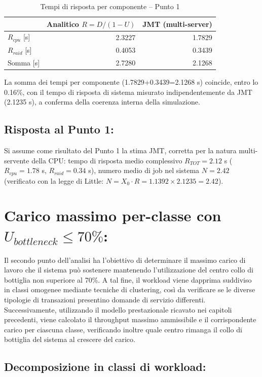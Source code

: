 \documentclass[11pt,a4paper]{article}
\begin{document}
\begin{table}[h]
\centering
\caption{Tempi di risposta per componente -- Punto 1}
\label{tab:punto1-percomp}
\begin{tabular}{lrr}
\toprule
 & Analitico $R=D/(1-U)$ & JMT (multi-server) \\
\midrule
$R_{cpu}$ [s] & 2.3227 & 1.7829 \\
$R_{raid}$ [s] & 0.4053 & 0.3439 \\
Somma [s] & 2.7280 & 2.1268 \\
\bottomrule
\end{tabular}
\end{table}

La somma dei tempi per componente (1.7829+0.3439=2.1268 s) coincide, entro lo 0.16\%, con il
tempo di risposta di sistema misurato indipendentemente da JMT (2.1235 s), a conferma della
coerenza interna della simulazione.

\subsection{Risposta al Punto 1:}
\label{sec:risposta-punto1}
Si assume come risultato del Punto 1 la stima JMT, corretta per la natura multi-servente della
CPU: tempo di risposta medio complessivo $R_{TOT}=2.12$ s ($R_{cpu}=1.78$ s, $R_{raid}=0.34$ s),
numero medio di job nel sistema $N=2.42$ (verificato con la legge di Little:
$N=X_0\cdot R = 1.1392\times 2.1235 = 2.42$).

\section{Carico massimo per-classe con $U_{bottleneck}\le 70\%$:}
Il secondo punto dell'analisi ha l'obiettivo di determinare il massimo carico di lavoro che il sistema può sostenere mantenendo l'utilizzazione del centro collo di bottiglia non superiore al 70\%. A tal fine, il workload viene dapprima suddiviso in classi omogenee mediante tecniche di clustering, così da verificare se le diverse tipologie di transazioni presentino domande di servizio differenti. Successivamente, utilizzando il modello prestazionale ricavato nei capitoli precedenti, viene calcolato il throughput massimo ammissibile e il corrispondente carico per ciascuna classe, verificando inoltre quale centro rimanga il collo di bottiglia del sistema al crescere del carico.
\subsection{Decomposizione in classi di workload:}
\label{sec:classi}
\end{document}
